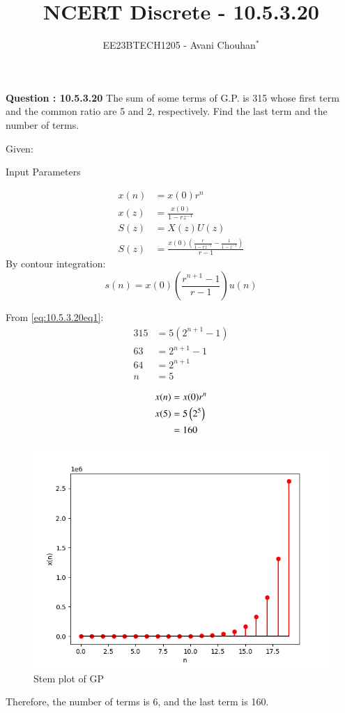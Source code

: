 \documentclass[journal,12pt,twocolumn]{IEEEtran}
\theoremstyle{remark}
\begin{document}

\vspace{3cm}

\title{NCERT Discrete - 10.5.3.20}
\author{EE23BTECH1205 - Avani Chouhan$^{*}$%
}
\maketitle
\newpage
\bigskip

\renewcommand{\thefigure}{\theenumi}
\renewcommand{\thetable}{\theenumi}

\vspace{3cm}
\textbf{Question : 10.5.3.20} 
The sum of some terms of G.P. is 315 whose first term and the common ratio are 5 and 2, respectively. Find the last term and the number of terms.\\
\solution

Given:
\begin{table}
  \centering
  
  
  \caption{Input Parameters}
  \label{tab:10.5.3.20table1}
\end{table}
\begin{align}
x(n) &= x(0)r^n\\
x(z) &= \frac{x(0)}{1-rz^{-1}}\\
S(z) &= X(z)U(z)\\
S(z) &= \frac{x(0)(\frac{r}{1-rz^{-1}}-\frac{1}{1-z^{-1}})}{r-1}
\end{align}
By contour integration:
\begin{equation}
s(n) = x(0)\left(\frac{r^{n+1}-1}{r-1}\right)u(n)
\label{eq:10.5.3.20eq1}
\end{equation}

From \eqref{eq:10.5.3.20eq1}:
\begin{align}
315 &= 5(2^{n+1}- 1)  \\
63 &= 2^{n+1}-1  \\
64 &= 2^{n+1} \\
n &= 5
\end{align}

\begin{align}
x(n) &= x(0)r^{n}\\
x(5) &= 5\left(2^{5}\right)\\
 &= 160 
\end{align}

\begin{figure}
    \centering
    \includegraphics[width=0.8\columnwidth]{figs/graph.png}
    \caption{Stem plot of GP}
    \label{fig:10.5.3.20fig1}
\end{figure}

Therefore, the number of terms is 6, and the last term is 160.
\end{document}
